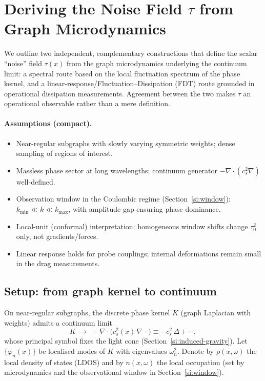 \documentclass[11pt]{article}
\begin{document}
\section{Deriving the Noise Field $\tau$ from Graph Microdynamics}\label{si:tau-from-graph}
We outline two independent, complementary constructions that define the scalar ``noise'' field $\tau(x)$ from the graph microdynamics underlying the continuum limit: a spectral route based on the local fluctuation spectrum of the phase kernel, and a linear-response/Fluctuation--Dissipation (FDT) route grounded in operational dissipation measurements. Agreement between the two makes $\tau$ an operational observable rather than a mere definition.

\paragraph{Assumptions (compact).}
\begin{itemize}[leftmargin=*]
  \item Near-regular subgraphs with slowly varying symmetric weights; dense sampling of regions of interest.
  \item Massless phase sector at long wavelengths; continuum generator $-\nabla\!\cdot(c_s^2\nabla)$ well-defined.
  \item Observation window in the Coulombic regime (Section~\ref{si:window}): $k_{\min}\ll k\ll k_{\max}$, with amplitude gap ensuring phase dominance.
  \item Local-unit (conformal) interpretation: homogeneous window shifts change $\tau_0^2$ only, not gradients/forces.
  \item Linear response holds for probe couplings; internal deformations remain small in the drag measurements.
\end{itemize}

\subsection*{Setup: from graph kernel to continuum}
On near-regular subgraphs, the discrete phase kernel $K$ (graph Laplacian with weights) admits a continuum limit
\begin{equation}
  K \;\longrightarrow\; -\nabla\!\cdot\!\big(c_s^2(x)\,\nabla\,\cdot\big) \equiv -c_s^2\,\Delta + \cdots,
\end{equation}
whose principal symbol fixes the light cone (Section~\ref{si:induced-gravity}). Let $\{\varphi_n(x)\}$ be localised modes of $K$ with eigenvalues $\omega_n^2$. Denote by $\rho(x,\omega)$ the local density of states (LDOS) and by $n(x,\omega)$ the local occupation (set by microdynamics and the observational window in Section~\ref{si:window}).
\end{document}
